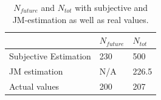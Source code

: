 \begin{table}[!htb]
	\centering
	\caption{$N_{future}$ and $N_{tot}$ with subjective and JM-estimation as well as real values.}
	\label{jelinskimorandatable}	
    \begin{tabular}{|l|l|l|}
        \hline
        ~ & $N_{future}$ & $N_{tot}$ \\ \hline
        Subjective Estimation            & 230   & 500 		\\ 
        JM estimation                    & N/A   & 226.5	\\ 
        Actual values                    & 200 	 & 207		\\ 
        \hline
    \end{tabular}
\end{table}